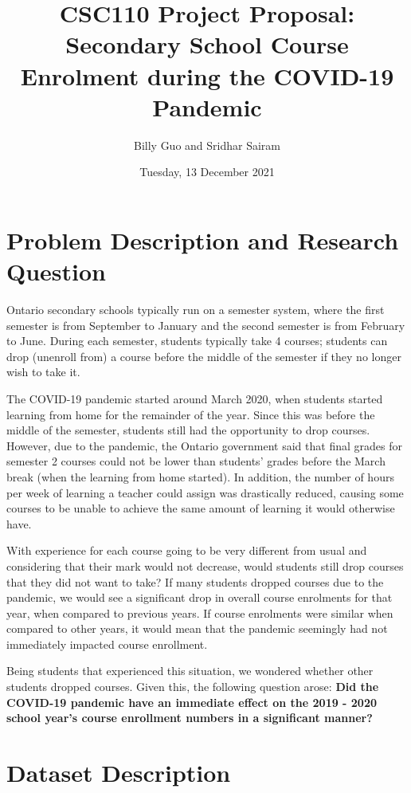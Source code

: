 \documentclass[fontsize=11pt]{article}
\title{CSC110 Project Proposal: Secondary School Course Enrolment during the COVID-19 Pandemic}
\author{Billy Guo and Sridhar Sairam}
\date{Tuesday, 13 December 2021}
\begin{document}
\maketitle

\section*{Problem Description and Research Question}  %

Ontario secondary schools typically run on a semester system, where the first semester is from September to January and the second semester is from February to June. During each semester, students typically take 4 courses; students can drop (unenroll from) a course before the middle of the semester if they no longer wish to take it.

The COVID-19 pandemic started around March 2020, when students started learning from home for the remainder of the year. Since this was before the middle of the semester, students still had the opportunity to drop courses. However, due to the pandemic, the Ontario government said that final grades for semester 2 courses could not be lower than students’ grades before the March break (when the learning from home started). In addition, the number of hours per week of learning a teacher could assign was drastically reduced, causing some courses to be unable to achieve the same amount of learning it would otherwise have.

With experience for each course going to be very different from usual and considering that their mark would not decrease, would students still drop courses that they did not want to take? If many students dropped courses due to the pandemic, we would see a significant drop in overall course enrolments for that year, when compared to previous years. If course enrolments were similar when compared to other years, it would mean that the pandemic seemingly had not immediately impacted course enrollment.

Being students that experienced this situation, we wondered whether other students dropped courses. Given this, the following question arose:
\textbf{Did the COVID-19 pandemic have an immediate effect on the 2019 - 2020 school year’s course enrollment numbers in a significant manner?}

\section*{Dataset Description}  %
\end{document}
